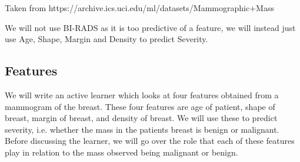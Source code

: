 \documentclass[12pt]{article}
\begin{document}
Taken from https://archive.ics.uci.edu/ml/datasets/Mammographic+Mass 

We will not use BI-RADS as it is too predictive of a feature, we will instead just use Age, Shape, Margin and Density to predict Severity.

\subsection{Features}

We will write an active learner which looks at four features obtained from a mammogram of the breast. These four features are age of patient, shape of breast, margin of breast, and density of breast. We will use these to predict severity, i.e. whether the mass in the patients breast is benign or malignant. Before discussing the learner, we will go over the role that each of these features play in relation to the mass observed being malignant or benign.
\end{document}
